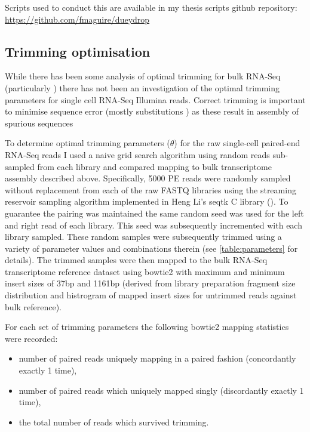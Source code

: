Scripts used to conduct this are available in my thesis scripts github repository:
\url{https://github.com/fmaguire/dueydrop}




\subsection{Trimming optimisation}

While there has been some analysis of optimal trimming for bulk RNA-Seq (particularly \citep{MacManes2014})
there has not been an investigation of the optimal trimming parameters for single cell RNA-Seq Illumina reads.
Correct trimming is important to minimise sequence error (mostly substitutions \citep{Yang2013}) as these
result in assembly of spurious sequences \citep{Macmanes2013,MacManes2014}


To determine optimal trimming parameters (\(\theta\)) for the raw single-cell paired-end RNA-Seq reads 
I used a naive grid search algorithm using random reads sub-sampled from each library and compared mapping
to bulk transcriptome assembly described above.
Specifically, 5000 PE reads were randomly sampled without replacement from each of the raw FASTQ libraries 
using the streaming reservoir sampling \citep{Vitter1985} algorithm implemented in Heng Li's 
seqtk C library (\citep{SeqtkGitHub}).
To guarantee the pairing was maintained the same random seed was used for the left and right read
of each library. This seed was subsequently incremented with each library sampled.
These random samples were subsequently trimmed using a variety of parameter values and combinations therein 
(see \ref{table:parameters} for details).
The trimmed samples were then mapped to the bulk RNA-Seq transcriptome reference dataset using bowtie2
\citep{Langmead2012} with maximum and minimum insert sizes of 37bp and 1161bp (derived from library preparation
fragment size distribution and histrogram of mapped insert sizes for untrimmed reads against bulk reference).


For each set of trimming parameters the following bowtie2 mapping statistics were recorded: 
\begin{itemize}
    \item number of paired reads uniquely mapping in a paired 
fashion (concordantly exactly 1 time), 
    \item number of paired reads which uniquely mapped 
singly (discordantly exactly 1 time), 
    \item the total number of reads which survived trimming.
\end{itemize}

